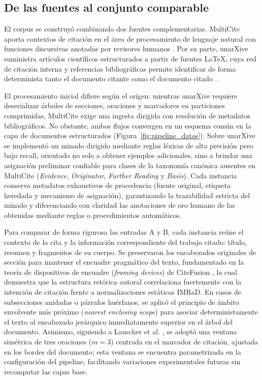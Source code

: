 \documentclass[10pt,a4paper,twocolumn]{article}
\begin{document}
\subsection{De las fuentes al conjunto comparable}
El corpus se construyó combinando dos fuentes complementarias. MultiCite aporta contextos de citación en el área de procesamiento de lenguaje natural con funciones discursivas anotadas por revisores humanos \cite{Lauscher2022}. Por su parte, unarXive suministra artículos científicos estructurados a partir de fuentes \LaTeX{}, cuya red de citación interna y referencias bibliográficas permite identificar de forma determinista tanto el documento citante como el documento citado  \cite{Besrour2026}.

El procesamiento inicial difiere según el origen: mientras unarXive requiere deserializar árboles de secciones, oraciones y marcadores en particiones comprimidas, MultiCite exige una ingesta dirigida con resolución de metadatos bibliográficos. No obstante, ambos flujos convergen en un esquema común en la capa de documentos estructurados (Figura~\ref{fig:pipeline_datos}). Sobre unarXive se implementó un minado dirigido mediante reglas léxicas de alta precisión pero bajo recall, orientado no solo a obtener ejemplos adicionales, sino a brindar una asignación preliminar confiable para clases de la taxonomía canónica ausentes en MultiCite (\textit{Evidence}, \textit{Originator}, \textit{Further Reading} y \textit{Basis}). Cada instancia conserva metadatos exhaustivos de procedencia (fuente original, etiqueta heredada y mecanismo de asignación), garantizando la trazabilidad estricta del minado y diferenciando con claridad las anotaciones de oro humano de las obtenidas mediante reglas o procedimientos automáticos.

Para comparar de forma rigurosa las entradas A y B, cada instancia reúne el contexto de la cita y la información correspondiente del trabajo citado: título, resumen y fragmentos de su cuerpo. Se preservaron los encabezados originales de sección para mantener el encuadre pragmático del texto, fundamentado en la teoría de dispositivos de encuadre (\textit{framing devices}) de CiteFusion \cite{Paolini2025}, la cual demuestra que la estructura retórica autoral correlaciona fuertemente con la intención de citación frente a normalizaciones estáticas IMRaD. En casos de subsecciones anidadas o párrafos huérfanos, se aplicó el principio de ámbito envolvente más próximo (\textit{nearest enclosing scope}) para asociar deterministamente el texto al encabezado jerárquico inmediatamente superior en el árbol del documento. Asimismo, siguiendo a Lauscher et al. \cite{Lauscher2022}, se adoptó una ventana simétrica de tres oraciones ($m=3$) centrada en el marcador de citación, ajustada en los bordes del documento; esta ventana se encuentra parametrizada en la configuración del pipeline, facilitando variaciones experimentales futuras sin recomputar las capas base.
\end{document}
